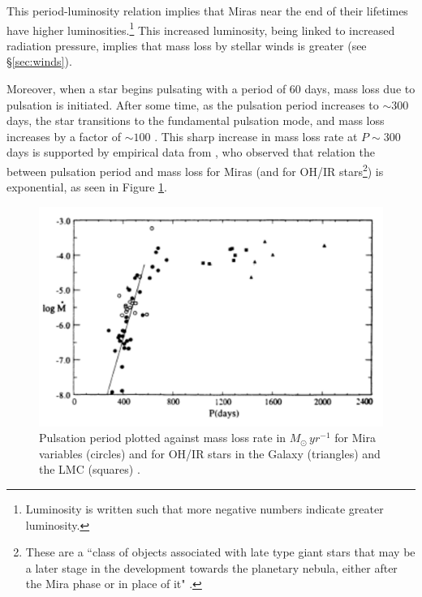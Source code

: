 \documentclass[twocolumn]{aastex63}
\begin{document}

This period-luminosity relation implies that Miras near the end of their lifetimes have higher luminosities.\footnote{Luminosity is written such that more negative numbers indicate greater luminosity.} This increased luminosity, being linked to increased radiation pressure, implies that mass loss by stellar winds is greater (see \S \ref{sec:winds}). 

Moreover, when a star begins pulsating with a period of 60 days, mass loss due to pulsation is initiated. After some time, as the pulsation period increases to $\sim 300$ days, the star transitions to the fundamental pulsation mode, and mass loss increases by a factor of $\sim 100$ \citep{mcdonald, bedijn}. This sharp increase in mass loss rate at $P\sim 300$ days is supported by empirical data from \cite{vassiliadis}, who observed that relation the between pulsation period and mass loss for Miras (and for OH/IR stars\footnote{These are a ``class of objects associated with late type giant stars that may be a later stage in the development towards the planetary nebula, either after the Mira phase or in place of it" \citep{pottasch}.}) is exponential, as seen in Figure \ref{fig:pulsation_massloss}.
\begin{figure}[ht]
    \includegraphics[width=\textwidth]{pulsation_massloss.png}
    \caption{Pulsation period plotted against mass loss rate in $M_\odot\,yr^{-1}$ for Mira variables (circles) and for OH/IR stars in the Galaxy (triangles) and the LMC (squares) \citep{vassiliadis}.}
    \label{fig:pulsation_massloss}
\end{figure}
\end{document}

